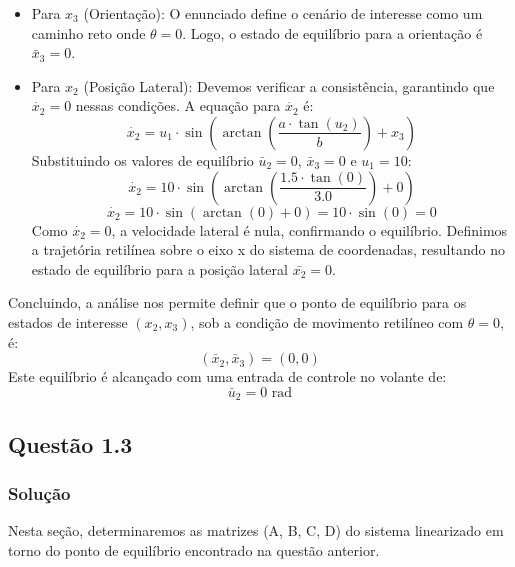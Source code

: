 \documentclass[a4paper,11pt]{article}
\begin{document}
\begin{itemize}
    \item Para $x_3$ (Orientação): O enunciado define o cenário de interesse como um caminho reto onde $\theta=0$. Logo, o estado de equilíbrio para a orientação é $\bar{x}_3 = 0$.
    \item Para $x_2$ (Posição Lateral): Devemos verificar a consistência, garantindo que $\dot{x_2}=0$ nessas condições. A equação para $\dot{x_2}$ é:
    \begin{equation}
        \dot{x_2} = u_1 \cdot \sin\left(\arctan\left(\frac{a \cdot \tan(u_2)}{b}\right) + x_3\right)
    \end{equation}
    Substituindo os valores de equilíbrio $\bar{u}_2 = 0$, $\bar{x}_3 = 0$ e $u_1 = 10$:
    $$ \dot{x_2} = 10 \cdot \sin\left(\arctan\left(\frac{1.5 \cdot \tan(0)}{3.0}\right) + 0\right) $$
    $$ \dot{x_2} = 10 \cdot \sin\left(\arctan(0) + 0\right) = 10 \cdot \sin(0) = 0 $$
    Como $\dot{x_2}=0$, a velocidade lateral é nula, confirmando o equilíbrio. Definimos a trajetória retilínea sobre o eixo x do sistema de coordenadas, resultando no estado de equilíbrio para a posição lateral $\bar{x_2} = 0$.
\end{itemize}


Concluindo, a análise nos permite definir que o ponto de equilíbrio para os estados de interesse $(x_2, x_3)$, sob a condição de movimento retilíneo com $\theta=0$, é:
$$ (\bar{x}_2, \bar{x}_3) = (0, 0) $$
Este equilíbrio é alcançado com uma entrada de controle no volante de:
$$ \bar{u}_2 = 0 \text{ rad} $$

\subsection*{\sc Questão 1.3}

\subsubsection*{\sc Solução}

Nesta seção, determinaremos as matrizes (A, B, C, D) do sistema linearizado em torno do ponto de equilíbrio encontrado na questão anterior.
\end{document}
